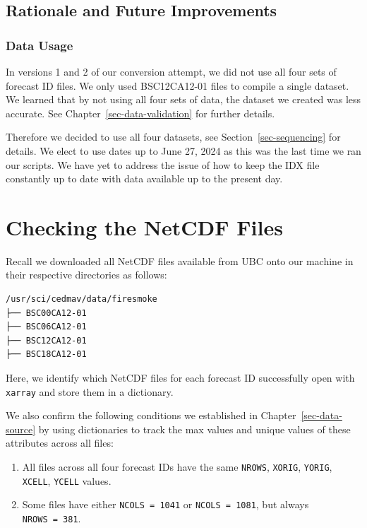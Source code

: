 \documentclass[
  letterpaper,
  DIV=11,
  numbers=noendperiod]{scrreprt}
\providecommand{\tightlist}{%
  \setlength{\itemsep}{0pt}\setlength{\parskip}{0pt}}\usepackage{longtable,booktabs,array}
\begin{document}
\subsection{Rationale and Future
Improvements}\label{rationale-and-future-improvements}

\subsubsection{Data Usage}\label{data-usage}

In versions 1 and 2 of our conversion attempt, we did not use all four
sets of forecast ID files. We only used BSC12CA12-01 files to compile a
single dataset. We learned that by not using all four sets of data, the
dataset we created was less accurate. See
Chapter~\ref{sec-data-validation} for further details.

Therefore we decided to use all four datasets, see
Section~\ref{sec-sequencing} for details. We elect to use dates up to
June 27, 2024 as this was the last time we ran our scripts. We have yet
to address the issue of how to keep the IDX file constantly up to date
with data available up to the present day.

\section{Checking the NetCDF Files}\label{checking-the-netcdf-files}

Recall we downloaded all NetCDF files available from UBC onto our
machine in their respective directories as follows:

\begin{verbatim}
/usr/sci/cedmav/data/firesmoke
├── BSC00CA12-01
├── BSC06CA12-01
├── BSC12CA12-01
├── BSC18CA12-01
\end{verbatim}

Here, we identify which NetCDF files for each forecast ID successfully
open with \texttt{xarray} and store them in a dictionary.

We also confirm the following conditions we established in
Chapter~\ref{sec-data-source} by using dictionaries to track the max
values and unique values of these attributes across all files:

\begin{enumerate}
\def\labelenumi{\arabic{enumi}.}
\tightlist
\item
  All files across all four forecast IDs have the same \texttt{NROWS},
  \texttt{XORIG}, \texttt{YORIG}, \texttt{XCELL}, \texttt{YCELL} values.
\item
  Some files have either \texttt{NCOLS\ =\ 1041} or
  \texttt{NCOLS\ =\ 1081}, but always \texttt{NROWS\ =\ 381}.
\end{enumerate}
\end{document}
